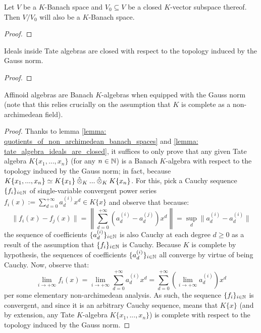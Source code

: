             \begin{lemma} \label{lemma: quotients_of_non_archimedean_banach_spaces}
                Let $V$ be a $K$-Banach space and $V_0 \subseteq V$ be a closed $K$-vector subspace thereof. Then $V/V_0$ will also be a $K$-Banach space. 
            \end{lemma}
                \begin{proof}
                    
                \end{proof}
            \begin{lemma} \label{lemma: tate_algebra_ideals_are_closed}
                Ideals inside Tate algebras are closed with respect to the topology induced by the Gauss norm.
            \end{lemma}
                \begin{proof}
                    
                \end{proof}
            \begin{proposition} \label{prop: affinoid_algebras_are_banach_algebras}
                Affinoid algebras are Banach $K$-algebras when equipped with the Gauss norm (note that this relies crucially on the assumption that $K$ is complete as a non-archimedean field).
            \end{proposition}
                \begin{proof}
                    Thanks to lemma \ref{lemma: quotients_of_non_archimedean_banach_spaces} and \ref{lemma: tate_algebra_ideals_are_closed}, it suffices to only prove that any given Tate algebra $K\{x_1, ..., x_n\}$ (for any $n \in \mathbb{N}$) is a Banach $K$-algebra with respect to the topology induced by the Gauss norm; in fact, because $K\{x_1, ..., x_n\} \cong K\{x_1\} \hattensor_K ... \hattensor_K K\{x_n\}$. For this, pick a Cauchy sequence $\{f_i\}_{i \in \mathbb{N}}$ of single-variable convergent power series $f_i(x) := \sum_{d = 0}^{+\infty} a_d^{(i)} x^d \in K\{x\}$ and observe that because:
                        $$\|f_i(x) - f_j(x)\| = \left\| \sum_{d = 0}^{+\infty} (a_d^{(i)} - a_d^{(j)}) x^d \right\| = \sup_d \|a_d^{(i)} - a_d^{(i)}\|$$
                    the sequence of coefficients $\{a_d^{(i)}\}_{i \in \mathbb{N}}$ is also Cauchy at each degree $d \geq 0$ as a result of the assumption that $\{f_i\}_{i \in \mathbb{N}}$ is Cauchy. Because $K$ is complete by hypothesis, the sequences of coefficients $\{a_d^{(i)}\}_{i \in \mathbb{N}}$ all converge by virtue of being Cauchy. Now, observe that:
                        $$\underset{i \to +\infty}{\lim} f_i(x) = \underset{i \to +\infty}{\lim} \sum_{d = 0}^{+\infty} a_d^{(i)} x^d = \sum_{d = 0}^{+\infty} \left( \underset{i \to +\infty}{\lim} a_d^{(i)} \right) x^d$$
                    per some elementary non-archimedean analysis. As such, the sequence $\{f_i\}_{i \in \mathbb{N}}$ is convergent, and since it is an arbitrary Cauchy sequence, means that $K\{x\}$ (and by extension, any Tate $K$-algebra $K\{x_1, ..., x_n\}$) is complete with respect to the topology induced by the Gauss norm. 
                \end{proof}
